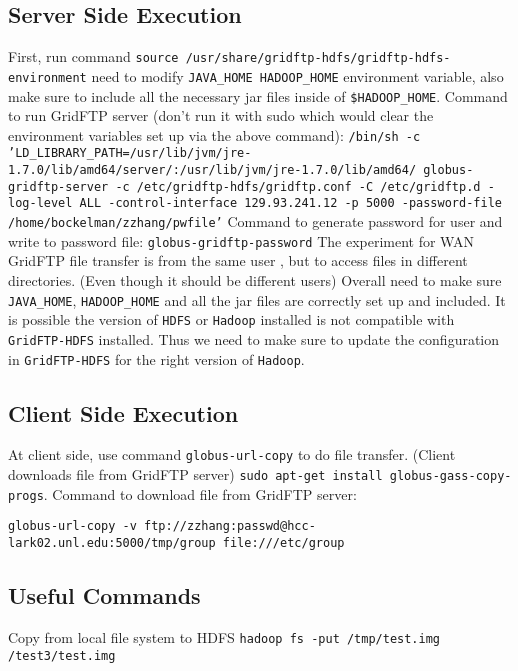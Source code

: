 \documentclass[a4paper]{article}
\begin{document}
\subsection{Server Side Execution}
First, run command {\tt source /usr/share/gridftp-hdfs/gridftp-hdfs-environment} need to modify {\tt JAVA\_HOME HADOOP\_HOME} environment variable, also make sure to include all the necessary jar files inside of {\tt \$HADOOP\_HOME}.\newline\newline
Command to run GridFTP server (don't run it with sudo which would clear the environment variables set up via the above command): {\tt /bin/sh -c 'LD\_LIBRARY\_PATH=/usr/lib/jvm/jre-1.7.0/lib/amd64/server/:/usr/lib/jvm/jre-1.7.0/lib/amd64/ globus-gridftp-server -c /etc/gridftp-hdfs/gridftp.conf -C /etc/gridftp.d -log-level ALL -control-interface 129.93.241.12 -p 5000 -password-file /home/bockelman/zzhang/pwfile'}\newline\newline
Command to generate password for user and write to password file: {\tt globus-gridftp-password} The experiment for WAN GridFTP file transfer is from the same user , but to access files in different directories. (Even though it should be different users)\newline \newline
Overall need to make sure {\tt JAVA\_HOME}, {\tt HADOOP\_HOME} and all the jar files are correctly set up and included. It is possible the version of {\tt HDFS} or {\tt Hadoop} installed is not compatible with {\tt GridFTP-HDFS} installed. Thus we need to make sure to update the configuration in {\tt GridFTP-HDFS} for the right version of {\tt Hadoop}.
\subsection{Client Side Execution}
At client side, use command {\tt globus-url-copy} to do file transfer. (Client downloads file from GridFTP server) {\tt sudo apt-get install globus-gass-copy-progs}.\newline \newline
Command to download file from GridFTP server: 

{\tt globus-url-copy -v ftp://zzhang:passwd@hcc-lark02.unl.edu:5000/tmp/group file:///etc/group}

\subsection{Useful Commands}
Copy from local file system to HDFS
{\tt hadoop fs -put /tmp/test.img /test3/test.img}
\end{document}
